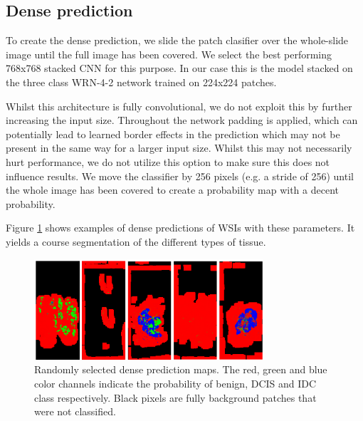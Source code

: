 \documentclass[journal]{IEEEtran}
\begin{document}
\subsection{Dense prediction}
To create the dense prediction, we slide the patch clasifier over the whole-slide image until the full image has been covered. We select the best performing 768x768 stacked CNN for this purpose. In our case this is the model stacked on the three class WRN-4-2 network trained on 224x224 patches.

Whilst this architecture is fully convolutional, we do not exploit this by further increasing the input size. Throughout the network padding is applied, which can potentially lead to learned border effects in the prediction which may not be present in the same way for a larger input size. Whilst this may not necessarily hurt performance, we do not utilize this option to make sure this does not influence results. We move the classifier by 256 pixels (e.g. a stride of 256) until the whole image has been covered to create a probability map with a decent probability. 

Figure \ref{fig_wsi_examples} shows examples of dense predictions of WSIs with these parameters. It yields a course segmentation of the different types of tissue.


\begin{figure}[h]
\centering{}
\hspace{0.09cm}\includegraphics[width=3.35in]{wsi_predictions_examples}
\vspace{-0.15cm}\caption{Randomly selected dense prediction maps. The red, green and blue color channels indicate the probability of benign, DCIS and IDC class respectively. Black pixels are fully background patches that were not classified.}
\label{fig_wsi_examples}
\end{figure}
\end{document}
